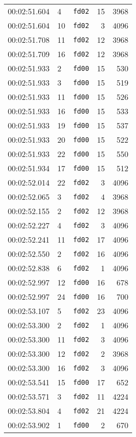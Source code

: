 \documentclass{article}
\begin{document}
\begin{longtable}{lllrr}
00:02:51.604 & 4 & \texttt{fd02} & 15 & 3968 \\
00:02:51.604 & 10 & \texttt{fd02} & 3 & 4096 \\
00:02:51.708 & 11 & \texttt{fd02} & 12 & 3968 \\
00:02:51.709 & 16 & \texttt{fd02} & 12 & 3968 \\
00:02:51.933 & 2 & \texttt{fd00} & 15 & 530 \\
00:02:51.933 & 3 & \texttt{fd00} & 15 & 519 \\
00:02:51.933 & 11 & \texttt{fd00} & 15 & 526 \\
00:02:51.933 & 16 & \texttt{fd00} & 15 & 533 \\
00:02:51.933 & 19 & \texttt{fd00} & 15 & 537 \\
00:02:51.933 & 20 & \texttt{fd00} & 15 & 522 \\
00:02:51.933 & 22 & \texttt{fd00} & 15 & 550 \\
00:02:51.934 & 17 & \texttt{fd00} & 15 & 512 \\
00:02:52.014 & 22 & \texttt{fd02} & 3 & 4096 \\
00:02:52.065 & 3 & \texttt{fd02} & 4 & 3968 \\
00:02:52.155 & 2 & \texttt{fd02} & 12 & 3968 \\
00:02:52.227 & 4 & \texttt{fd02} & 3 & 4096 \\
00:02:52.241 & 11 & \texttt{fd02} & 17 & 4096 \\
00:02:52.550 & 2 & \texttt{fd02} & 16 & 4096 \\
00:02:52.838 & 6 & \texttt{fd02} & 1 & 4096 \\
00:02:52.997 & 12 & \texttt{fd00} & 16 & 678 \\
00:02:52.997 & 24 & \texttt{fd00} & 16 & 700 \\
00:02:53.107 & 5 & \texttt{fd02} & 23 & 4096 \\
00:02:53.300 & 2 & \texttt{fd02} & 1 & 4096 \\
00:02:53.300 & 11 & \texttt{fd02} & 3 & 4096 \\
00:02:53.300 & 12 & \texttt{fd02} & 2 & 3968 \\
00:02:53.300 & 16 & \texttt{fd02} & 3 & 4096 \\
00:02:53.541 & 15 & \texttt{fd00} & 17 & 652 \\
00:02:53.571 & 3 & \texttt{fd02} & 11 & 4224 \\
00:02:53.804 & 4 & \texttt{fd02} & 21 & 4224 \\
00:02:53.902 & 1 & \texttt{fd00} & 2 & 670 \\

\end{longtable}
\end{document}
